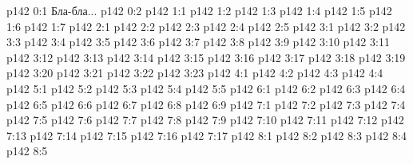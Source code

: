 \author{Промежуточные создания}
\vs p142 0:1  Бла-бла...
\vs p142 0:2 \pc 
{}
\vs p142 1:1 
\vs p142 1:2 
\vs p142 1:3 
\vs p142 1:4 
\vs p142 1:5 
\vs p142 1:6 \pc 
\vs p142 1:7 
\vs p142 2:1 
\vs p142 2:2 \pc 
\vs p142 2:3 
\vs p142 2:4 \pc 
\vs p142 2:5 
\vs p142 3:1 
\vs p142 3:2 
\vs p142 3:3 
\vs p142 3:4 
\vs p142 3:5 
\vs p142 3:6 
\vs p142 3:7 
\vs p142 3:8 
\vs p142 3:9 \pc 
\vs p142 3:10 
\vs p142 3:11 
\vs p142 3:12 
\vs p142 3:13 
\vs p142 3:14 
\vs p142 3:15 
\vs p142 3:16 
\vs p142 3:17 
\vs p142 3:18 
\vs p142 3:19 
\vs p142 3:20 
\vs p142 3:21 \pc 
\vs p142 3:22 
\vs p142 3:23 \pc 
{}
\vs p142 4:1 
\vs p142 4:2 
\vs p142 4:3 
\vs p142 4:4 \pc 
{}
\vs p142 5:1 
\vs p142 5:2 \pc 
\vs p142 5:3 
\vs p142 5:4 
\vs p142 5:5 \pc 
{}
\vs p142 6:1 
\vs p142 6:2 
\vs p142 6:3 
\vs p142 6:4 
\vs p142 6:5 
\vs p142 6:6 
\vs p142 6:7 
\vs p142 6:8 
\vs p142 6:9 
\vs p142 7:1 
\vs p142 7:2 
\vs p142 7:3 
\vs p142 7:4 
\vs p142 7:5 
\vs p142 7:6 
\vs p142 7:7 
\vs p142 7:8 
\vs p142 7:9 
\vs p142 7:10 
\vs p142 7:11 
\vs p142 7:12 
\vs p142 7:13 \pc 
\vs p142 7:14 
\vs p142 7:15 
\vs p142 7:16 
\vs p142 7:17 
\vs p142 8:1 
\vs p142 8:2 
\vs p142 8:3 
\vs p142 8:4 
\vs p142 8:5 
\quizlink

